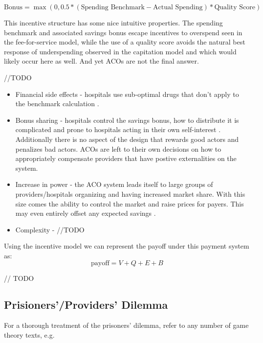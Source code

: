 \documentclass{article}
\begin{document}
\begin{equation}
    \text{Bonus} = \max (0, 0.5 * (\text{Spending Benchmark} - \text{Actual Spending}) * \text{Quality Score})
\end{equation}

This incentive structure has some nice intuitive properties. The spending benchmark and associated savings bonus escape incentives to overspend seen in the fee-for-service model, while the use of a quality score avoids the natural best response of underspending observed in the capitation model and which would likely occur here as well. And yet ACOs are not the final answer.

//TODO
\begin{itemize}
    \item Financial side effects - hospitals use sub-optimal drugs that don't apply to the benchmark calculation \cite{acoethics}.
    \item Bonus sharing - hospitals control the savings bonus, how to distribute it is complicated and prone to hospitals acting in their own self-interest \cite{inflation}. Additionally there is no aspect of the design that rewards good actors and penalizes bad actors. ACOs are left to their own decisions on how to appropriately compensate providers that have postive externalities on the system.
    \item Increase in power - the ACO system leads itself to large groups of providers/hospitals organizing and having increased market share. With this size comes the ability to control the market and raise prices for payers. This may even entirely offset any expected savings \cite{acoecon}.
    \item Complexity - //TODO
\end{itemize}

Using the incentive model we can represent the payoff under this payment system as:
\begin{equation}
    \text{payoff} = V + Q + E + B
\end{equation}

// TODO

\subsection*{Prisioners'/Providers' Dilemma}
For a thorough treatment of the prisoners' dilemma, refer to any number of game theory texts, e.g. \cite{networks}
\end{document}
